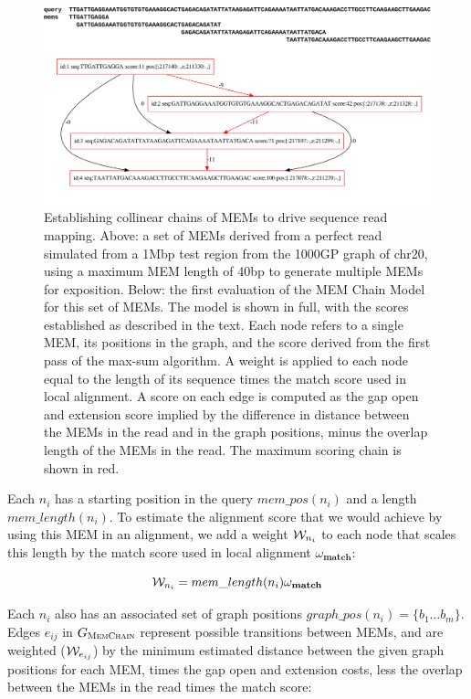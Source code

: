 \begin{figure}[htbp!]
\centering
\includegraphics[width=1.0\textwidth]{Chapter2/Figs/memchain_dag.pdf}
\caption[The MEM Chain Model]{
  Establishing collinear chains of MEMs to drive sequence read mapping.
  Above: a set of MEMs derived from a perfect read simulated from a 1Mbp test region from the 1000GP graph of chr20, using a maximum MEM length of 40bp to generate multiple MEMs for exposition.
  Below: the first evaluation of the MEM Chain Model for this set of MEMs.
  The model is shown in full, with the scores established as described in the text.
  Each node refers to a single MEM, its positions in the graph, and the score derived from the first pass of the max-sum algorithm.
  A weight is applied to each node equal to the length of its sequence times the match score used in local alignment.
  A score on each edge is computed as the gap open and extension score implied by the difference in distance between the MEMs in the read and in the graph positions, minus the overlap length of the MEMs in the read.
  The maximum scoring chain is shown in red.
}
\label{fig:memchain_model}
\end{figure}

Each $n_i$ has a starting position in the query $mem\_pos(n_i)$ and a length $mem\_length(n_i)$.
To estimate the alignment score that we would achieve by using this MEM in an alignment, we add a weight ${\cal W}_{n_i}$ to each node that scales this length by the match score used in local alignment $\omega_\textbf{match}$:

\begin{equation}
  {\cal W}_{n_i} = mem\_length(n_i) \omega_\textbf{match}
\end{equation}

Each $n_i$ also has an associated set of graph positions $graph\_pos(n_i) = \{ b_1 \ldots b_m \}$.
Edges $e_{ij}$ in $G_\textsc{MemChain}$ represent possible transitions between MEMs, and are weighted (${\cal W}_{e_{ij}}$) by the minimum estimated distance between the given graph positions for each MEM, times the gap open and extension costs, less the overlap between the MEMs in the read times the match score:

